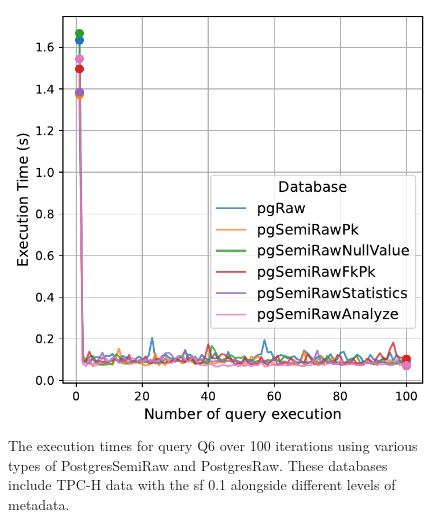 \begin{figure}[hbt!]
\centering
\includegraphics[width=1.0\linewidth]{charts-eval-exp-time/execution_time_db_type_Q6.pdf}
\caption[Q6:result]{The execution times for query Q6 over 100 iterations using various types of PostgresSemiRaw and PostgresRaw. These databases include TPC-H data with the \acrshort{sf} 0.1 alongside different levels of metadata.}
\label{fig:execution_time_db_type_Q6}
\end{figure}
